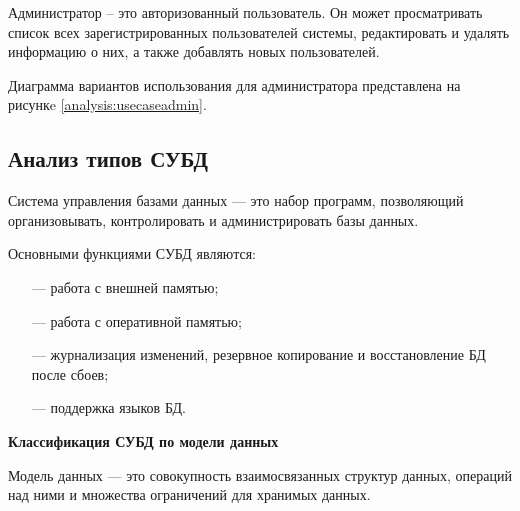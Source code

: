 \pagebreak

Администратор – это авторизованный пользователь. Он может просматривать список всех зарегистрированных пользователей системы, редактировать и удалять информацию о них, а также добавлять новых пользователей.

Диаграмма вариантов использования для администратора представлена на рисункe \ref{analysis:usecaseadmin}.

\begin{figure}[H]
\end{figure}

\pagebreak

\subsection{Анализ типов СУБД}

Система управления базами данных \cite{subd} — это набор программ, позволяющий организовывать, контролировать и администрировать базы данных.

Основными функциями СУБД являются:

\begin{itemize}[leftmargin=0.7cm +  - ]
	\item[---] работа с внешней памятью;
	\item[---] работа с оперативной памятью;
	\item[---] журнализация изменений, резервное копирование и восстановление БД после сбоев;
	\item[---] поддержка языков БД.
\end{itemize}

\textbf{Классификация СУБД по модели данных}

Модель данных \cite{models} — это совокупность взаимосвязанных структур данных, операций над ними и множества ограничений для хранимых данных.

